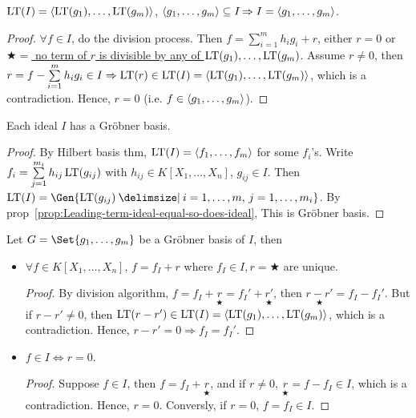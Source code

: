 \begin{prop} \label{prop:Leading-term-ideal-so-does-ideal}
  $\operatorname{LT}(I) = \langle\operatorname{LT}(g_1),\dots,\operatorname{LT}(g_m)\rangle$, $\langle g_1,\dots,g_m\rangle \subseteq I$$\Rightarrow I = \langle g_1,\dots,g_m\rangle$.
  \begin{proof}
    $\forall f \in I$, do the division process. Then
    $f = \sum\limits_{i=1}^m h_ig_i+r$, either $r=0$ or
    \uline{$\bigstar =$ no term of $r$ is divisible by any of
    $\operatorname{LT}(g_1),\dots,\operatorname{LT}(g_m)$}. Assume $r \neq 0$, then
    $r = f - \sum\limits_{i=1}^m h_i g_i \in I \Rightarrow \operatorname{LT}(r) \in \operatorname{LT}(I) =
    \langle \operatorname{LT}(g_1),\dots, \operatorname{LT}(g_m) \rangle$, which is a contradiction.
    Hence, $r = 0$ (i.e. $f\in \langle g_1,\dots,g_m \rangle$).
  \end{proof}
\end{prop}

\begin{theorem} \label{thm:Grobner-existense}
  Each ideal $I$ has a Gr\"{o}bner basis.
  \begin{proof}
    By Hilbert basis thm, $\operatorname{LT}(I) = \langle f_1,\dots,f_m \rangle$ for some $f_i$'s.
    Write $f_i = \sum\limits_{j=1}^{m_i} h_{ij}\operatorname{LT}(g_{ij})$ with
    $h_{ij} \in K[X_1,\dots,X_n]$, $g_{ij} \in I$. Then
    $\LT(I) = \Gen{ \LT(g_{ij}) \given i=1,\dots,m,\, j=1,\dots,m_i}$.
  By prop~\ref{prop:Leading-term-ideal-equal-so-does-ideal}, 
  This is Gr\"{o}bner basis.
  \end{proof}
\end{theorem}

\begin{theorem} \label{thm:Grobner-property}
  Let $G = \Set{g_1,\dots,g_m}$ be a Gr\"{o}bner basis of $I$, then
  \begin{itemize}
    \item $\forall f \in K[X_1,\dots,X_n]$, $f = f_I + r$ where
      $f_I \in I, r = \bigstar$ are unique.
      \begin{proof}
        By division algorithm, $f = f_I +\underset{\bigstar}{r} =
        f_I'+\underset{\bigstar}{r'}$, then $\underset{\bigstar}{r-r'} = f_I-f_I'$.
        But if $r-r' \neq 0$, then $\operatorname{LT}(r-r') \in \operatorname{LT}(I) =
        \langle \operatorname{LT}(g_1),\dots,\operatorname{LT}(g_m) \rangle$, which is a contradiction.
        Hence, $r-r' = 0\Rightarrow f_I = f_I'$.
      \end{proof}
    \item $f \in I \iff r=0$.
      \begin{proof}
        Suppose $f \in I$, then $f = f_I + \underset{\bigstar}{r}$, and if $r\neq 0$,
        $\underset{\bigstar}{r} = f - f_I\in I$, which is a contradiction.
        Hence, $r = 0$. Conversly, if $r = 0$, $f = f_I \in I$. 
      \end{proof}
  \end{itemize}
\end{theorem}


